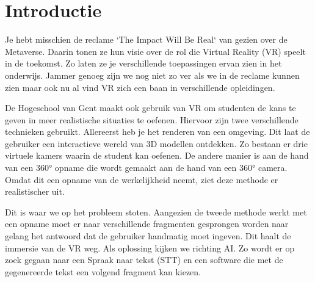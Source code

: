 
\section{Introductie}%
\label{sec:introductie}

Je hebt misschien de reclame `The Impact Will Be Real` van \textcite{Meta2022} gezien over de Metaverse. Daarin tonen ze hun visie over de rol die Virtual Reality (VR) speelt in de toekomst. Zo laten ze je verschillende toepassingen ervan zien in het onderwijs. Jammer genoeg zijn we nog niet zo ver als we in de reclame kunnen zien maar ook nu al vind VR zich een baan in verschillende opleidingen.

De Hogeschool van Gent maakt ook gebruik van VR om studenten de kans te geven in meer realistische situaties te oefenen. Hiervoor zijn twee verschillende technieken gebruikt. Allereerst heb je het renderen van een omgeving. Dit laat de gebruiker een interactieve wereld van 3D modellen ontdekken. Zo bestaan er drie virtuele kamers waarin de student kan oefenen. De andere manier is aan de hand van een 360° opname die wordt gemaakt aan de hand van een 360° camera. Omdat dit een opname van de werkelijkheid neemt, ziet deze methode er realistischer uit.

Dit is waar we op het probleem stoten. Aangezien de tweede methode werkt met een opname moet er naar verschillende fragmenten gesprongen worden naar gelang het antwoord dat de gebruiker handmatig moet ingeven. Dit haalt de immersie van de VR weg. Als oplossing kijken we richting AI. Zo wordt er op zoek gegaan naar een Spraak naar tekst (STT) en een software die met de gegenereerde tekst een volgend fragment kan kiezen.

